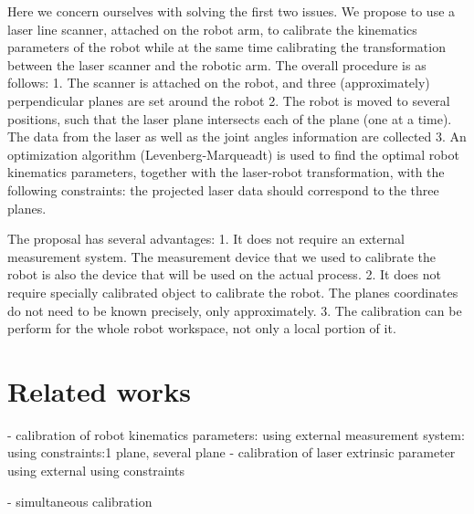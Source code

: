 Here we concern ourselves with solving the first two issues. We propose to use a laser line scanner, attached on the robot arm, to calibrate the kinematics parameters of the robot while at the same time calibrating the transformation between the laser scanner and the robotic arm. 
The overall procedure is as follows:
1. The scanner is attached on the robot, and three (approximately) perpendicular planes are set around the robot
2. The robot is moved to several positions, such that the laser plane intersects each of the plane (one at a time). The data from the laser as well as the joint angles information are collected
3. An optimization algorithm (Levenberg-Marqueadt) is used to find the optimal robot kinematics parameters, together with the laser-robot transformation, with the following constraints: the projected laser data should correspond to the three planes. 

The proposal has several advantages:
1. It does not require an external measurement system. The measurement device that we used to calibrate the robot is also the device that will be used on the actual process. 
2. It does not require specially calibrated object to calibrate the robot. The planes coordinates do not need to be known precisely, only approximately. 
3. The calibration can be perform for the whole robot workspace, not only a local portion of it. 


\section{Related works}
\label{sec:related}
- calibration of robot kinematics parameters:
  using external measurement system:
  using constraints:1 plane, several plane
- calibration of laser extrinsic parameter
  using external
  using constraints
  
- simultaneous calibration

	

